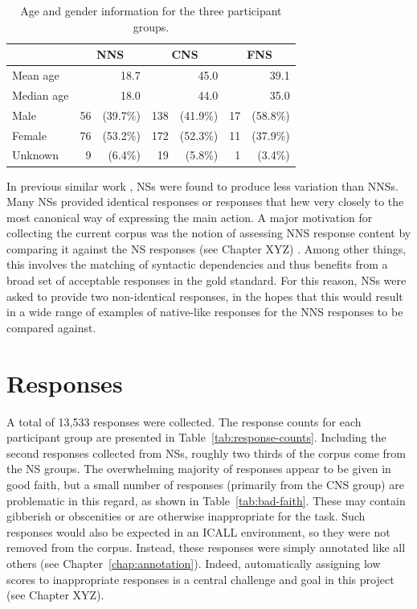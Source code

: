 \begin{table}[htb!]
\begin{center}
\begin{tabular}{|l|rr|rr|rr|}
\hline
& \multicolumn{2}{|c|}{NNS} & \multicolumn{2}{|c|}{CNS} & \multicolumn{2}{|c|}{FNS} \\
\hline
\hline
Mean age & \multicolumn{2}{|r|}{18.7} & \multicolumn{2}{|r|}{45.0} & \multicolumn{2}{|r|}{39.1} \\
\hline
Median age & \multicolumn{2}{|r|}{18.0} & \multicolumn{2}{|r|}{44.0} & \multicolumn{2}{|r|}{35.0} \\
\hline
\hline
Male & 56 & (39.7\%) & 138 & (41.9\%) & 17 & (58.8\%) \\
\hline
Female & 76 & (53.2\%) & 172 & (52.3\%) & 11 & (37.9\%) \\
\hline
Unknown & 9 & (6.4\%) & 19 & (5.8\%) & 1 & (3.4\%) \\
\hline
\end{tabular}
\caption{\label{tab:demographics} Age and gender information for the three participant groups.}
\end{center}
\end{table}


In previous similar work \citep{king:dickinson:13},
NSs were found to produce less variation than NNSs. Many NSs provided identical responses or responses that hew very closely to the most canonical way of expressing the main action. A major motivation for collecting the current corpus was the notion of assessing NNS response content by comparing it against the NS responses (see Chapter XYZ) . Among other things, this involves the matching of syntactic dependencies and thus benefits from a broad set of acceptable responses in the gold standard. For this reason, NSs were asked to provide two non-identical responses, in the hopes that this would result in a wide range of examples of native-like responses for the NNS responses to be compared against.

\section{Responses}
\label{sec:responses}

A total of 13,533 responses were collected. The response counts for each participant group are presented in Table~\ref{tab:response-counts}. Including the second responses collected from NSs, roughly two thirds of the corpus come from the NS groups. The overwhelming majority of responses appear to be given in good faith, but a small number of responses (primarily from the CNS group) are problematic in this regard, as shown in Table~\ref{tab:bad-faith}. These may contain gibberish or obscenities or are otherwise inappropriate for the task. Such responses would also be expected in an ICALL environment, so they were not removed from the corpus. Instead, these responses were simply annotated like all others (see Chapter~\ref{chap:annotation}). Indeed, automatically assigning low scores to inappropriate responses is a central challenge and goal in this project (see Chapter XYZ).

